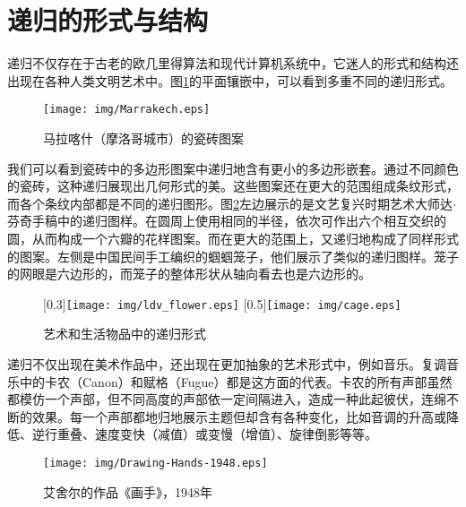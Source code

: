 \documentclass{article}
\begin{document}
\section{递归的形式与结构}

递归不仅存在于古老的欧几里得算法和现代计算机系统中，它迷人的形式和结构还出现在各种人类文明艺术中。图\ref{fig:Ceramic-Tile-Tessellations-Marrakech}的平面镶嵌中，可以看到多重不同的递归形式。

\begin{figure}[htbp]
 \centering
 \texttt{[image: img/Marrakech.eps]}
 \caption{马拉喀什（摩洛哥城市）的瓷砖图案}
 \label{fig:Ceramic-Tile-Tessellations-Marrakech}
\end{figure}

我们可以看到瓷砖中的多边形图案中递归地含有更小的多边形嵌套。通过不同颜色的瓷砖，这种递归展现出几何形式的美。这些图案还在更大的范围组成条纹形式，而各个条纹内部都是不同的递归图形。图\ref{fig:flower}左边展示的是文艺复兴时期艺术大师达$\cdot$芬奇手稿中的递归图样。在圆周上使用相同的半径，依次可作出六个相互交织的圆，从而构成一个六瓣的花样图案。而在更大的范围上，又递归地构成了同样形式的图案。左侧是中国民间手工编织的蝈蝈笼子，他们展示了类似的递归图样。笼子的网眼是六边形的，而笼子的整体形状从轴向看去也是六边形的。

\begin{figure}[htbp]
 \centering
 [0.3\linewidth]{\texttt{[image: img/ldv\_flower.eps]}} \quad
 [0.5\linewidth]{\texttt{[image: img/cage.eps]}}
 \caption{艺术和生活物品中的递归形式}
 \label{fig:flower}
\end{figure}

递归不仅出现在美术作品中，还出现在更加抽象的艺术形式中，例如音乐。复调音乐中的卡农（Canon）和赋格（Fugue）都是这方面的代表。卡农的所有声部虽然都模仿一个声部，但不同高度的声部依一定间隔进入，造成一种此起彼伏，连绵不断的效果。每一个声部都地归地展示主题但却含有各种变化，比如音调的升高或降低、逆行重叠、速度变快（减值）或变慢（增值）、旋律倒影等等。

\begin{wrapfigure}{L}{0.45\textwidth}
 \centering
 \texttt{[image: img/Drawing-Hands-1948.eps]}
 \caption{艾舍尔的作品《画手》，1948年}
 \label{fig:Drawing-Hands}
\end{wrapfigure}
\end{document}
